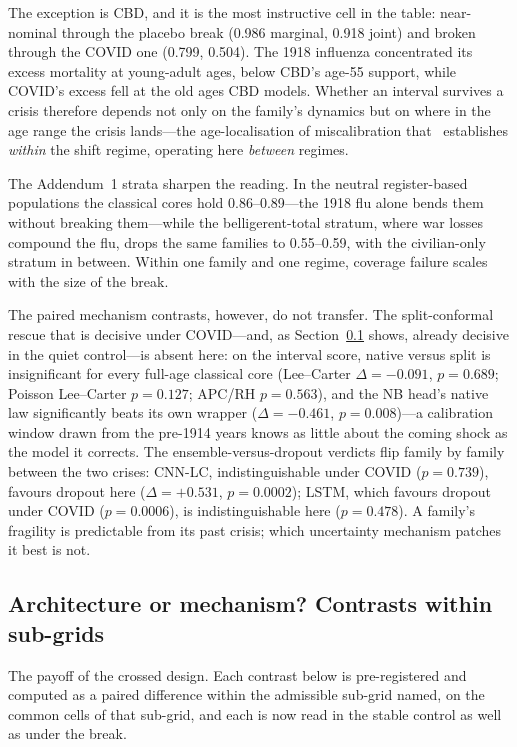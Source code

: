 The exception is CBD, and it is the most instructive cell in the table:
near-nominal through the placebo break (0.986 marginal, 0.918 joint)
and broken through the COVID one (0.799, 0.504). The 1918 influenza
concentrated its excess mortality at young-adult ages, below CBD's
age-55 support, while COVID's excess fell at the old ages CBD models.
Whether an interval survives a crisis therefore depends not only on the
family's dynamics but on where in the age range the crisis lands---the
age-localisation of miscalibration that \Hfour\ establishes \emph{within}
the shift regime, operating here \emph{between} regimes.

The Addendum~1 strata sharpen the reading. In the neutral
register-based populations the classical cores hold 0.86--0.89---the
1918 flu alone bends them without breaking them---while the
belligerent-total stratum, where war losses compound the flu, drops the
same families to 0.55--0.59, with the civilian-only stratum in between.
Within one family and one regime, coverage failure scales with the size
of the break.

The paired mechanism contrasts, however, do not transfer. The
split-conformal rescue that is decisive under COVID---and, as
Section~\ref{sec:results-contrasts} shows, already decisive in the
quiet control---is absent here: on the interval score, native versus
split is insignificant for every full-age classical core (Lee--Carter
$\Delta=-0.091$, $p=0.689$; Poisson Lee--Carter $p=0.127$; APC/RH
$p=0.563$), and the NB head's native law significantly beats its own
wrapper ($\Delta=-0.461$, $p=0.008$)---a calibration window drawn from
the pre-1914 years knows as little about the coming shock as the model it
corrects. The ensemble-versus-dropout verdicts flip family by family
between the two crises: CNN-LC, indistinguishable under COVID
($p=0.739$), favours dropout here ($\Delta=+0.531$, $p=0.0002$); LSTM,
which favours dropout under COVID ($p=0.0006$), is indistinguishable
here ($p=0.478$). A family's fragility is predictable from its past
crisis; which uncertainty mechanism patches it best is not.

\subsection{Architecture or mechanism? Contrasts within sub-grids}
\label{sec:results-contrasts}

The payoff of the crossed design. Each contrast below is pre-registered and
computed as a paired difference within the admissible sub-grid named, on
the common cells of that sub-grid, and each is now read in the stable
control as well as under the break.

